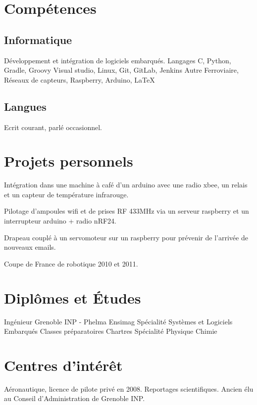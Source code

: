 \documentclass[10pt,a4paper]{moderncv}
\begin{document}
\section{Compétences}

  \subsection{Informatique}

    {\small Développement et intégration de logiciels embarqués.\newline{}}
    {Langages}
    {\small C, Python, Gradle, Groovy}
    {\small Visual studio, Linux, Git, GitLab, Jenkins\newline{}}
    {Autre}
    {\small Ferroviaire, Réseaux de capteurs, Raspberry, Arduino, \LaTeX} 

  \subsection{Langues}

    {\small Ecrit courant, parlé occasionnel.\newline{}}

\section{Projets personnels}
  {\small Intégration dans une machine à café d'un arduino avec une radio xbee, un relais et un capteur de température infrarouge.}
  
  {\small Pilotage d'ampoules wifi et de prises RF 433MHz via un serveur raspberry et un interrupteur arduino + radio nRF24.}
  
  {\small Drapeau couplé à un servomoteur sur un raspberry pour prévenir de l'arrivée de nouveaux emails.\newline{}}
  
  {\small Coupe de France de robotique 2010 et 2011.}

\section{Diplômes et Études}
  {Ingénieur Grenoble INP - Phelma Ensimag}
  {}
  {}
  {}
  {Spécialité Systèmes et Logiciels Embarqués\newline{}}
  {Classes préparatoires}
  {}
  {}
  {Chartres}
  {Spécialité Physique Chimie\newline{}}

\section{Centres d'intérêt}
  {\small Aéronautique, licence de pilote privé en 2008.}
  \cvline{}
  {\small Reportages scientifiques.}
  \cvline{}
  {\small Ancien élu au Conseil d'Administration de Grenoble INP.}
\end{document}
